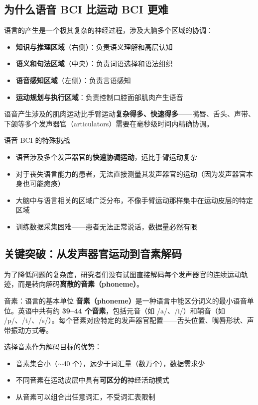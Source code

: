 \subsection{为什么语音 BCI 比运动 BCI 更难}

语言的产生是一个极其复杂的神经过程，涉及大脑多个区域的协调：

\begin{itemize}
    \item \textbf{知识与推理区域}（右侧）：负责语义理解和高层认知
    \item \textbf{语义和句法区域}（中央）：负责词语选择和语法组织
    \item \textbf{语音感知区域}（左侧）：负责言语感知
    \item \textbf{运动规划与执行区域}：负责控制口腔面部肌肉产生语音
\end{itemize}

语音产生涉及的肌肉运动比手臂运动\textbf{复杂得多、快速得多}——嘴唇、舌头、声带、下颌等多个发声器官（articulators）需要在毫秒级时间内精确协调。

\begin{warningbox}{语音 BCI 的特殊挑战}
\begin{itemize}
    \item 语音涉及多个发声器官的\textbf{快速协调运动}，远比手臂运动复杂
    \item 对于丧失语言能力的患者，无法直接测量其发声器官的运动（因为发声器官本身也可能瘫痪）
    \item 大脑中与语言相关的区域广泛分布，不像手臂运动那样集中在运动皮层的特定区域
    \item 训练数据采集困难——患者无法正常说话，数据量必然有限
\end{itemize}
\end{warningbox}

\subsection{关键突破：从发声器官运动到音素解码}

为了降低问题的复杂度，研究者们没有试图直接解码每个发声器官的连续运动轨迹，而是转向解码\textbf{离散的音素（phoneme）}。

\begin{knowledgebox}{音素：语言的基本单位}
\textbf{音素（phoneme）}是一种语言中能区分词义的最小语音单位。英语中共有约 \textbf{39--44 个音素}，包括元音（如 /a/、/i/）和辅音（如 /p/、/t/、/s/）。每个音素对应特定的发声器官配置——舌头位置、嘴唇形状、声带振动方式等。

选择音素作为解码目标的优势：
\begin{itemize}
    \item 音素集合小（$\sim$40 个），远少于词汇量（数万个），数据需求少
    \item 不同音素在运动皮层中具有\textbf{可区分的}神经活动模式
    \item 从音素可以组合出任意词汇，不受词汇表限制
\end{itemize}
\end{knowledgebox}

